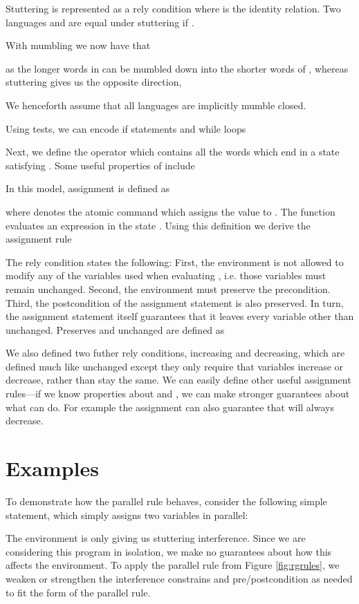 \documentclass{llncs}
\begin{document}
Stuttering is represented as a rely condition 
where  is the identity relation. Two languages  and  are
equal under stuttering if .

With mumbling we now have that

as the longer words in  can be mumbled down into
the shorter words of , whereas stuttering gives us the opposite direction,

We henceforth assume that all languages are
implicitly mumble closed.

Using tests, we can encode if statements and while loops

Next, we define the operator  which contains all the
words which end in a state satisfying . Some useful properties of  include


In this model, assignment is defined as

where  denotes the atomic command which assigns the
value  to . The  function evaluates an expression  in
the state . Using this definition we derive the assignment
rule


The rely condition states the following: First, the environment is not
allowed to modify any of the variables used when evaluating ,
i.e. those variables must remain unchanged. Second, the
environment must preserve the precondition. Third, the postcondition
of the assignment statement is also preserved. In turn, the assignment
statement itself guarantees that it leaves every variable other than
 unchanged. Preserves and unchanged are defined as

We also defined two futher rely conditions, increasing and decreasing,
which are defined much like unchanged except they only require that
variables increase or decrease, rather than stay the same. We can
easily define other useful assignment rules---if we know properties about
 and , we can make stronger guarantees about what  can
do. For example the assignment  can also guarantee that
 will always decrease.

\section{Examples}
\label{sec:Examples}

To demonstrate how the parallel rule behaves, consider the following
simple statement, which simply assigns two variables in parallel:

The environment  is only giving us stuttering
interference. Since we are considering this program in isolation, we
make no guarantees about how this affects the environment. To apply
the parallel rule from Figure \ref{fig:rgrules}, we weaken or
strengthen the interference constrains and pre/postcondition as needed
to fit the form of the parallel rule.
\end{document}
